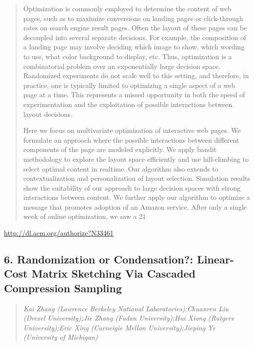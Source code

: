 \documentclass{article}
\begin{document}
\begin{quote}
Optimization is commonly employed to determine the content of web pages, such as to maximize conversions on landing pages or click-through rates on search engine result pages. Often the layout of these pages can be decoupled into several separate decisions. For example, the composition of a landing page may involve deciding which image to show, which wording to use, what color background to display, etc. Thus, optimization is a combinatorial problem over an exponentially large decision space. Randomized experiments do not scale well to this setting, and therefore, in practice, one is typically limited to optimizing a single aspect of a web page at a time. This represents a missed opportunity in both the speed of experimentation and the exploitation of possible interactions between layout decisions.







  Here we focus on multivariate optimization of interactive web pages. We formulate an approach where the possible interactions between different components of the page are modeled explicitly. We apply bandit methodology to explore the layout space efficiently and use hill-climbing to select optimal content in realtime. Our algorithm also extends to contextualization and personalization of layout selection. Simulation results show the suitability of our approach to large decision spaces with strong interactions between content. We further apply our algorithm to optimize a message that promotes adoption of an Amazon service. After only a single week of online optimization, we saw a 21%
\end{quote}

\href{http://dl.acm.org/authorize?N33461}{http://dl.acm.org/authorize?N33461}

\subsection{6. Randomization or Condensation?: Linear-Cost Matrix Sketching Via Cascaded Compression Sampling}

\begin{quote}
\footnotesize{\textit{Kai Zhang (Lawrence Berkeley National Laboratories);Chuanren Liu (Drexel University);Jie Zhang (Fudan University);Hui Xiong (Rutgers University);Eric Xing (Carneigie Mellon University);Jieping Ye (University of Michigan)}}

\end{quote}
\end{document}
